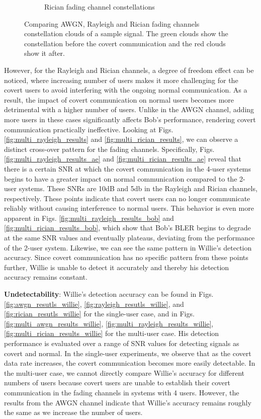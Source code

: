 \begin{figure}[tp!]
\begin{subfigure}{0.325\linewidth}
\begin{subfigure}{0.48\textwidth}
		\end{subfigure}
		\caption{Rician fading channel constellations}
		\label{fig:rician_constellation}
	\end{subfigure}
	\caption{Comparing AWGN, Rayleigh and Rician fading channels constellation clouds of a sample signal. The green clouds show the constellation before the covert communication and the red clouds show it after.}
	\label{fig:constellation}
\end{figure}


However, for the Rayleigh and Rician channels, a degree of freedom effect can be noticed, where increasing number of users makes it more challenging for the covert users to avoid interfering with the ongoing normal communication. As a result, the impact of covert communication on normal users becomes more detrimental with a higher number of users. Unlike in the AWGN channel, adding more users in these cases significantly affects Bob's performance, rendering covert communication practically ineffective. Looking at Figs. \ref{fig:multi_rayleigh_results} and \ref{fig:multi_rician_results}, we can observe a distinct cross-over pattern for the fading channels. Specifically, Figs. \ref{fig:multi_rayleigh_results_ae} and \ref{fig:multi_rician_results_ae} reveal that there is a certain SNR at which the covert communication in the 4-user systems begins to have a greater impact on normal communication compared to the 2-user systems. These SNRs are 10dB and 5db in the Rayleigh and Rician channels, respectively. These points indicate that covert users can no longer communicate reliably without causing interference to normal users. This behavior is even more apparent in Figs. \ref{fig:multi_rayleigh_results_bob} and \ref{fig:multi_rician_results_bob}, which show that Bob's BLER begins to degrade at the same SNR values and eventually plateaus, deviating from the performance of the 2-user system. Likewise, we can see the same pattern in Willie's detection accuracy. Since covert communication has no specific pattern from these points further, Willie is unable to detect it accurately and thereby his detection accuracy remains constant.

\textbf{Undetectability}: Willie's detection accuracy can be found in Figs. \ref{fig:awgn_resutls_willie}, \ref{fig:rayleigh_resutls_willie}, and \ref{fig:rician_resutls_willie} for the single-user case, and in Figs. \ref{fig:multi_awgn_results_willie}, \ref{fig:multi_rayleigh_results_willie}, \ref{fig:multi_rician_results_willie} for the multi-user case. His detection performance is evaluated over a range of SNR values for detecting signals as covert and normal. In the single-user experiments, we observe that as the covert data rate increases, the covert communication becomes more easily detectable. In the multi-user case, we cannot directly compare Willie's accuracy for different numbers of users because covert users are unable to establish their covert communication in the fading channels in systems with 4 users. However, the results from the AWGN channel indicate that Willie's accuracy remains roughly the same as we increase the number of users.

